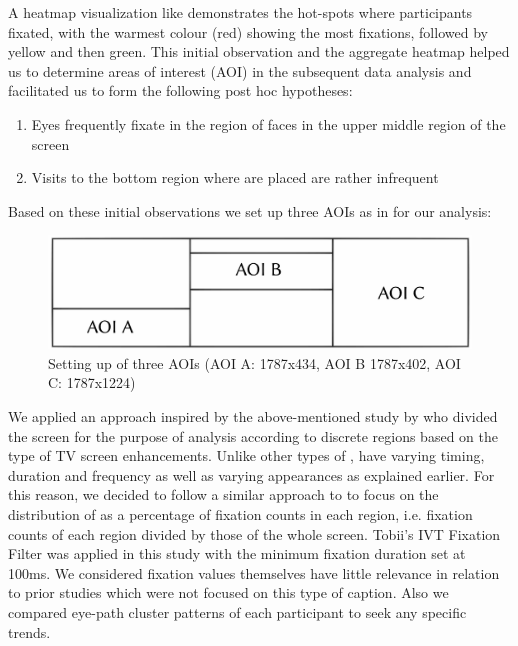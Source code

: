 \documentclass[output=paper]{langsci/langscibook}
\begin{document}
A heatmap visualization like  demonstrates the hot-spots where participants fixated, with the warmest colour (red) showing the most fixations, followed by yellow and then green. This initial observation and the aggregate heatmap helped us to determine areas of interest (AOI) in the subsequent  data analysis and facilitated us to form the following post hoc hypotheses:

\begin{enumerate}
\item Eyes frequently fixate in the region of faces in the upper middle region of the screen
\item Visits to the bottom region where  are placed are rather infrequent
\end{enumerate}

Based on these initial observations we set up three AOIs as in  for our analysis:

\begin{figure}
 \includegraphics[width=\textwidth]{figures/OHagan3.pdf}


	\caption{Setting up of three AOIs (AOI A: 1787x434, AOI B 1787x402, AOI C: 1787x1224)}
	\label{ohagan:fig:3}
\end{figure}

We applied an approach inspired by the above-mentioned study by \citet{josephson2006} who divided the screen for the purpose of analysis according to discrete regions based on the type of TV screen enhancements. Unlike other types of ,  have varying timing, duration and frequency as well as varying appearances as explained earlier. For this reason, we decided to follow a similar approach to \citet{josephson2006} to focus on the distribution of  as a percentage of fixation counts in each region, i.e. fixation counts of each region divided by those of the whole screen.  Tobii's IVT Fixation Filter was applied in this study with the minimum fixation duration set at 100ms. We considered fixation values themselves have little relevance in relation to prior studies which were not focused on this type of caption. Also we compared eye-path cluster patterns of each participant to seek any specific trends.  
\end{document}
